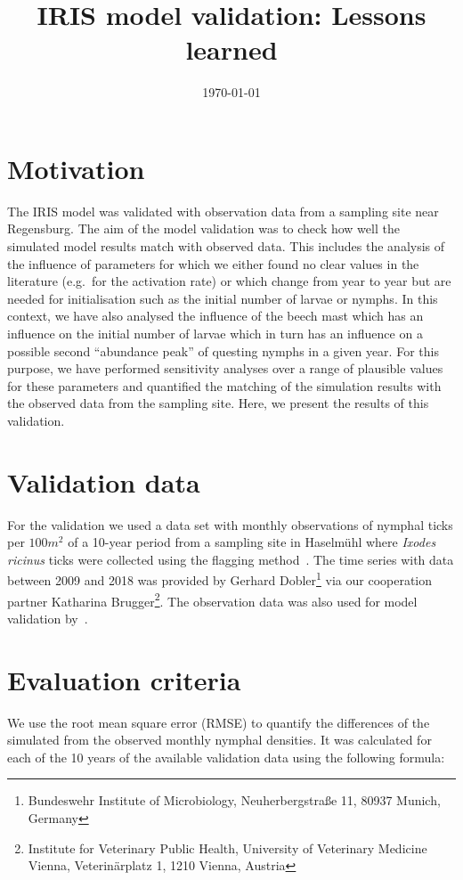 \documentclass[a4paper, 11pt]{scrartcl}
\title{IRIS model validation: Lessons learned}
\author{}
\date{\today}
\begin{document}
\maketitle


\section{Motivation}
The IRIS model was validated with observation data from a sampling site near Regensburg. The aim of the model validation was to check how well the simulated model results match
with observed data. This includes the analysis of the influence of parameters for which we either found no clear values in the literature (e.g.\ for the activation rate) or
which change from year to year but are needed for initialisation such as the initial number of larvae or nymphs. In this context, we have also analysed the influence of the
beech mast which has an influence on the initial number of larvae which in turn has an influence on a possible second ``abundance peak'' of questing nymphs in a given year. For
this purpose, we have performed sensitivity analyses over a range of plausible values for these parameters and quantified the matching of the simulation results with the
observed data from the sampling site. Here, we present the results of this validation.


\section{Validation data}
For the validation we used a data set with monthly observations of nymphal ticks per $100 m^2$ of a 10-year period from a sampling site in Haselmühl where
\textit{Ixodes ricinus} ticks were collected using the flagging method~\parencite{Brugger.2017}. The time series with data between 2009 and 2018 was provided by
Gerhard Dobler\footnote{Bundeswehr Institute of Microbiology, Neuherbergstraße 11, 80937 Munich, Germany} via our cooperation partner Katharina
Brugger\footnote{Institute for Veterinary Public Health, University of Veterinary Medicine Vienna, Veterinärplatz 1, 1210 Vienna, Austria}. The observation data was also
used for model validation by~\textcite{Brugger.2017, Brugger.2018}.


\section{Evaluation criteria}
We use the root mean square error (RMSE) to quantify the differences of the simulated from the observed monthly nymphal densities. It was calculated for each of the 10 years of
the available validation data using the following formula:
\end{document}
